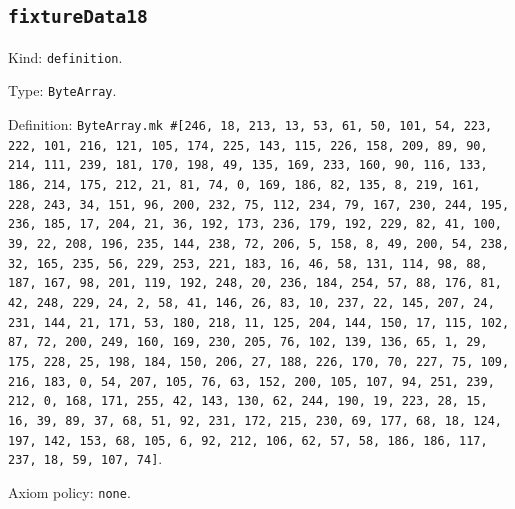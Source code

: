\documentclass[11pt]{article}
\begin{document}
\subsection*{\texttt{fixtureData18}}
\noindent Kind: \texttt{definition}.\par
\noindent Type: \texttt{ByteArray}.\par
\noindent Definition: \texttt{ByteArray.mk \#[246, 18, 213, 13, 53, 61, 50, 101, 54, 223, 222, 101, 216, 121, 105, 174, 225, 143, 115, 226, 158, 209, 89, 90, 214, 111, 239, 181, 170, 198, 49, 135, 169, 233, 160, 90, 116, 133, 186, 214, 175, 212, 21, 81, 74, 0, 169, 186, 82, 135, 8, 219, 161, 228, 243, 34, 151, 96, 200, 232, 75, 112, 234, 79, 167, 230, 244, 195, 236, 185, 17, 204, 21, 36, 192, 173, 236, 179, 192, 229, 82, 41, 100, 39, 22, 208, 196, 235, 144, 238, 72, 206, 5, 158, 8, 49, 200, 54, 238, 32, 165, 235, 56, 229, 253, 221, 183, 16, 46, 58, 131, 114, 98, 88, 187, 167, 98, 201, 119, 192, 248, 20, 236, 184, 254, 57, 88, 176, 81, 42, 248, 229, 24, 2, 58, 41, 146, 26, 83, 10, 237, 22, 145, 207, 24, 231, 144, 21, 171, 53, 180, 218, 11, 125, 204, 144, 150, 17, 115, 102, 87, 72, 200, 249, 160, 169, 230, 205, 76, 102, 139, 136, 65, 1, 29, 175, 228, 25, 198, 184, 150, 206, 27, 188, 226, 170, 70, 227, 75, 109, 216, 183, 0, 54, 207, 105, 76, 63, 152, 200, 105, 107, 94, 251, 239, 212, 0, 168, 171, 255, 42, 143, 130, 62, 244, 190, 19, 223, 28, 15, 16, 39, 89, 37, 68, 51, 92, 231, 172, 215, 230, 69, 177, 68, 18, 124, 197, 142, 153, 68, 105, 6, 92, 212, 106, 62, 57, 58, 186, 186, 117, 237, 18, 59, 107, 74]}.\par
\noindent Axiom policy: \texttt{none}.\par
\end{document}
